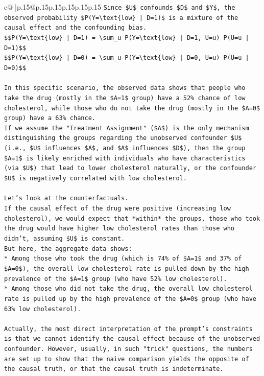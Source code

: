 \documentclass{article}
\begin{document}
{\begin{supertabular}{c@{$\;$}|p{.15\linewidth}@{}p{.15\linewidth}p{.15\linewidth}p{.15\linewidth}p{.15\linewidth}p{.15\linewidth}}
{{{\texttt{Since \$U\$ confounds \$D\$ and \$Y\$, the observed probability \$P(Y=\textbackslash{}text\{low\} | D=1)\$ is a mixture of the causal effect and the confounding bias.} \\
\texttt{\$\$P(Y=\textbackslash{}text\{low\} | D=1) = \textbackslash{}sum\_u P(Y=\textbackslash{}text\{low\} | D=1, U=u) P(U=u | D=1)\$\$} \\
\texttt{\$\$P(Y=\textbackslash{}text\{low\} | D=0) = \textbackslash{}sum\_u P(Y=\textbackslash{}text\{low\} | D=0, U=u) P(U=u | D=0)\$\$} \\
\\ 
\texttt{In this specific scenario, the observed data shows that people who take the drug (mostly in the \$A=1\$ group) have a 52\% chance of low cholesterol, while those who do not take the drug (mostly in the \$A=0\$ group) have a 63\% chance.} \\
\texttt{If we assume the "Treatment Assignment" (\$A\$) is the only mechanism distinguishing the groups regarding the unobserved confounder \$U\$ (i.e., \$U\$ influences \$A\$, and \$A\$ influences \$D\$), then the group \$A=1\$ is likely enriched with individuals who have characteristics (via \$U\$) that lead to lower cholesterol naturally, or the confounder \$U\$ is negatively correlated with low cholesterol.} \\
\\ 
\texttt{Let's look at the counterfactuals.} \\
\texttt{If the causal effect of the drug were positive (increasing low cholesterol), we would expect that *within* the groups, those who took the drug would have higher low cholesterol rates than those who didn't, assuming \$U\$ is constant.} \\
\texttt{But here, the aggregate data shows:} \\
\texttt{*   Among those who took the drug (which is 74\% of \$A=1\$ and 37\% of \$A=0\$), the overall low cholesterol rate is pulled down by the high prevalence of the \$A=1\$ group (who have 52\% low cholesterol).} \\
\texttt{*   Among those who did not take the drug, the overall low cholesterol rate is pulled up by the high prevalence of the \$A=0\$ group (who have 63\% low cholesterol).} \\
\\ 
\texttt{Actually, the most direct interpretation of the prompt's constraints is that we cannot identify the causal effect because of the unobserved confounder. However, usually, in such "trick" questions, the numbers are set up to show that the naive comparison yields the opposite of the causal truth, or that the causal truth is indeterminate.} \\
}}}
\end{supertabular}}
\end{document}
